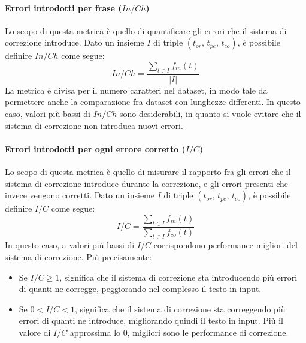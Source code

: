 \paragraph{Errori introdotti per frase ($In/Ch$)} Lo scopo di questa metrica è quello di quantificare gli errori che il sistema di correzione introduce. Dato un insieme $I$ di triple $(\text{$t_{or}$, $t_{pe}$, $t_{co}$})$, è possibile definire $In/Ch$ come segue:
\begin{equation}
In/Ch = \frac{
    \sum_{t \in I} f_{in}(t)
}{
	|I|
}
\end{equation}
La metrica è divisa per il numero caratteri nel dataset, in modo tale da permettere anche la comparazione fra dataset con lunghezze differenti. In questo caso, valori più bassi di $In/Ch$ sono desiderabili, in quanto si vuole evitare che il sistema di correzione non introduca nuovi errori.

\paragraph{Errori introdotti per ogni errore corretto ($I/C$)} Lo scopo di questa metrica è quello di misurare il rapporto fra gli errori che il sistema di correzione introduce durante la correzione, e gli errori presenti che invece vengono corretti. Dato un insieme $I$ di triple $(\text{$t_{or}$, $t_{pe}$, $t_{co}$})$, è possibile definire $I/C$ come segue:
\begin{equation}
I/C = \frac{
    \sum_{t \in I} f_{in}(t)
}{
	\sum_{t \in I} f_{co}(t)
}
\end{equation}
In questo caso, a valori più bassi di $I/C$ corrispondono performance migliori del sistema di correzione. Più precisamente:
\begin{itemize}
\item Se $I/C \geq 1$, significa che il sistema di correzione sta introducendo più errori di quanti ne corregge, peggiorando nel complesso il testo in input.

\item Se $0 < I/C < 1$, significa che il sistema di correzione sta correggendo più errori di quanti ne introduce, migliorando quindi il testo in input. Più il valore di $I/C$ approssima lo 0, migliori sono le performance di correzione.
\end{itemize}

